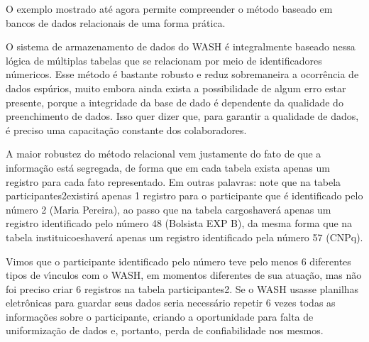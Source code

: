 \documentclass[
12pt,		%
openright,	%
twoside,  %
a4paper,			%
chapter=TITLE,		%
english,			%
french,				%
spanish,			%
brazil				%
]{USPSC-classe/USPSC}
\begin{document}
O exemplo mostrado at\'e agora permite compreender o m\'etodo baseado em bancos de dados relacionais de uma forma pr\'atica.










O sistema de armazenamento de dados do WASH \'e integralmente baseado nessa l\'ogica de m\'ultiplas tabelas que se relacionam por meio de identificadores n\'umericos. Esse m\'etodo \'e bastante robusto e reduz sobremaneira a ocorr\^encia de dados esp\'urios, muito embora ainda exista a possibilidade de algum erro estar presente, porque a integridade da base de dado \'e dependente da qualidade do preenchimento de dados. Isso quer dizer que, para garantir a qualidade de dados, \'e preciso uma capacita\c{c}\~ao constante dos colaboradores.










A maior robustez do m\'etodo relacional vem justamente do fato de que a informa\c{c}\~ao est\'a segregada, de forma que em cada tabela exista apenas um registro para cada fato representado. Em outras palavras: note que na tabela \textquotedbl participantes2\textquotedbl  existir\'a apenas 1 registro para o participante que \'e identificado pelo n\'umero 2 (Maria Pereira), ao passo que na tabela \textquotedbl cargos\textquotedbl  haver\'a apenas um registro identificado pelo n\'umero 48 (Bolsista EXP B), da mesma forma que na tabela \textquotedbl instituicoes\textquotedbl  haver\'a apenas um registro identificado pela n\'umero 57 (CNPq).










Vimos que o participante identificado pelo n\'umero \textquotedbl  teve  pelo menos 6 diferentes tipos de v\'{\i}nculos com o WASH, em momentos diferentes de sua atua\c{c}\~ao, mas n\~ao foi preciso criar 6 registros na tabela \textquotedbl participantes2\textquotedbl . Se o WASH usasse planilhas eletr\^onicas para guardar seus dados seria necess\'ario repetir 6 vezes todas as informa\c{c}\~oes sobre o participante, criando a oportunidade para falta de uniformiza\c{c}\~ao de dados e, portanto, perda de confiabilidade nos mesmos.
\end{document}
